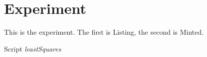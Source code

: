 \documentclass{article}
\begin{document}
\section{Experiment}

This is the experiment. The first is Listing, the second is Minted.


\begin{listing}[h!]
\caption{Script \emph{leastSquares}}
\label{code:myLabel}
\end{listing}

\end{document}
